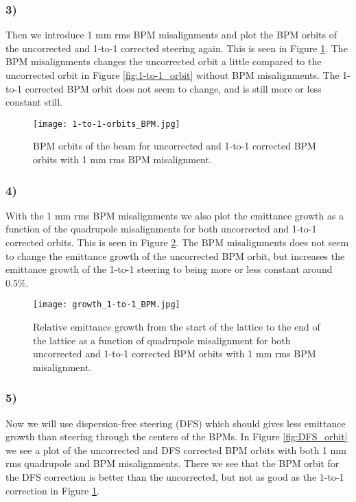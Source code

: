 \documentclass[12pt,a4paper,english]{article}
\begin{document}
\subsubsection*{3)}
Then we introduce 1 mm rms BPM misalignments and plot the BPM orbits of the uncorrected and 1-to-1 corrected steering again. This is seen in Figure \ref{fig:1-to-1_BPM_orbit}. The BPM misalignments changes the uncorrected orbit a little compared to the uncorrected orbit in Figure \ref{fig:1-to-1_orbit} without BPM misalignments. The 1-to-1 corrected BPM orbit does not seem to change, and is still more or less constant still.

\begin{figure}[htbp!]
	\centering\texttt{[image: 1-to-1-orbits\_BPM.jpg]}
	\caption{BPM orbits of the beam for uncorrected and 1-to-1 corrected BPM orbits with 1 mm rms BPM misalignment. \label{fig:1-to-1_BPM_orbit}}
\end{figure} 

\subsubsection*{4)}
With the 1 mm rms BPM misalignments we also plot the emittance growth as a function of the quadrupole misalignments for both uncorrected and 1-to-1 corrected orbits. This is seen in Figure \ref{fig:em_growth_1to1_BPM}. The BPM misalignments does not seem to change the emittance growth of the uncorrected BPM orbit, but increases the emittance growth of the 1-to-1 steering to being more or less constant around 0.5\%.

\begin{figure}[htbp!]
	\centering\texttt{[image: growth\_1-to-1\_BPM.jpg]}
	\caption{Relative emittance growth from the start of the lattice to the end of the lattice as a function of quadrupole misalignment for both uncorrected and 1-to-1 corrected BPM orbits with 1 mm rms BPM misalignment. \label{fig:em_growth_1to1_BPM}}
\end{figure} 

\subsubsection*{5)}
Now we will use dispersion-free steering (DFS) which should gives less emittance growth than steering through the centers of the BPMs. In Figure \ref{fig:DFS_orbit} we see a plot of the uncorrected and DFS corrected BPM orbits with both 1 mm rms quadrupole and BPM misalignments. There we see that the BPM orbit for the DFS correction is better than the uncorrected, but not as good as the 1-to-1 correction in Figure \ref{fig:1-to-1_BPM_orbit}.
\end{document}
